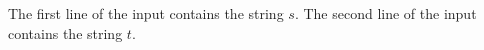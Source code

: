 The first line of the input contains the string $s$.
The second line of the input contains the string $t$.